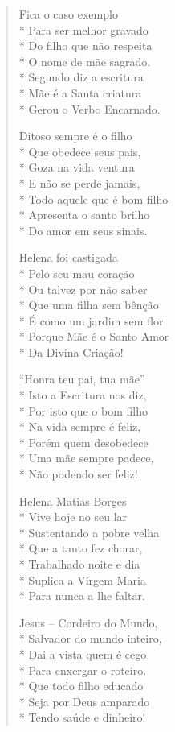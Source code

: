 \begin{verse}
Fica o caso exemplo\\*
Para ser melhor gravado\\*
Do filho que não respeita\\*
O nome de mãe sagrado.\\*
Segundo diz a escritura\\*
Mãe é a Santa criatura\\*
Gerou o Verbo Encarnado.

Ditoso sempre é o filho\\*
Que obedece seus pais,\\*
Goza na vida ventura\\*
E não se perde jamais,\\*
Todo aquele que é bom filho\\*
Apresenta o santo brilho\\*
Do amor em seus sinais.

Helena foi castigada\\*
Pelo seu mau coração\\*
Ou talvez por não saber\\*
Que uma filha sem bênção\\*
É como um jardim sem flor\\*
Porque Mãe é o Santo Amor\\*
Da Divina Criação!

``Honra teu pai, tua mãe''\\*
Isto a Escritura nos diz,\\*
Por isto que o bom filho\\*
Na vida sempre é feliz,\\*
Porém quem desobedece\\*
Uma mãe sempre padece,\\*
Não podendo ser feliz!

Helena Matias Borges\\*
Vive hoje no seu lar\\*
Sustentando a pobre velha\\*
Que a tanto fez chorar,\\*
Trabalhado noite e dia\\*
Suplica a Virgem Maria\\*
Para nunca a lhe faltar.

Jesus -- Cordeiro do Mundo,\\*
Salvador do mundo inteiro,\\*
Dai a vista quem é cego\\*
Para enxergar o roteiro.\\*
Que todo filho educado\\*
Seja por Deus amparado\\*
Tendo saúde e dinheiro!


\end{verse}
